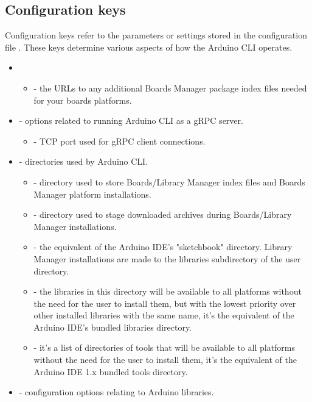 \subsection{Configuration keys}

Configuration keys refer to the parameters or settings stored in the configuration file . These keys determine various aspects of how the Arduino CLI operates. \cite{ArduinoCLIConfig:2024}

\begin{itemize}
	\item {}
	\begin{itemize}
		\item {} - the URLs to any additional Boards Manager package index files needed for your boards platforms.
	\end{itemize}
	\item {} - options related to running Arduino CLI as a gRPC server.
	\begin{itemize}
		\item {} - TCP port used for gRPC client connections.
	\end{itemize}
	\item {} - directories used by Arduino CLI.
	\begin{itemize}
		\item {} - directory used to store Boards/Library Manager index files and Boards Manager platform installations.
		\item {} - directory used to stage downloaded archives during Boards/Library Manager installations.
		\item {} - the equivalent of the Arduino IDE's "sketchbook" directory. Library Manager installations are made to the libraries subdirectory of the user directory.
		\item {} - the libraries in this directory will be available to all platforms without the need for the user to install them, but with the lowest priority over other installed libraries with the same name, it's the equivalent of the Arduino IDE's bundled libraries directory.
		\item {} - it's a list of directories of tools that will be available to all platforms without the need for the user to install them, it's the equivalent of the Arduino IDE 1.x bundled tools directory.
	\end{itemize}
	\item {} - configuration options relating to Arduino libraries.

\end{itemize}
